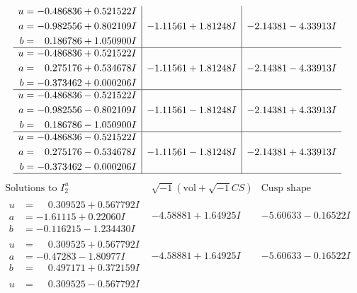\documentclass[1p]{elsarticle_modified}
\theoremstyle{definition}
\newcommand{\I}{\sqrt{-1}}
\begin{document}
$$\begin{array}{c|c|c}
\begin{aligned}
u &= -0.486836 + 0.521522 I \\
a &= -0.982556 + 0.802109 I \\
b &= \phantom{-}0.186786 + 1.050900 I\end{aligned}
 & -1.11561 + 1.81248 I & -2.14381 - 4.33913 I \\ \hline\begin{aligned}
u &= -0.486836 + 0.521522 I \\
a &= \phantom{-}0.275176 + 0.534678 I \\
b &= -0.373462 + 0.000206 I\end{aligned}
 & -1.11561 + 1.81248 I & -2.14381 - 4.33913 I \\ \hline\begin{aligned}
u &= -0.486836 - 0.521522 I \\
a &= -0.982556 - 0.802109 I \\
b &= \phantom{-}0.186786 - 1.050900 I\end{aligned}
 & -1.11561 - 1.81248 I & -2.14381 + 4.33913 I \\ \hline\begin{aligned}
u &= -0.486836 - 0.521522 I \\
a &= \phantom{-}0.275176 - 0.534678 I \\
b &= -0.373462 - 0.000206 I\end{aligned}
 & -1.11561 - 1.81248 I & -2.14381 + 4.33913 I\\
 \hline 
 \end{array}$$\newpage$$\begin{array}{c|c|c}  
\text{Solutions to }I^u_{2}& \I (\text{vol} + \sqrt{-1}CS) & \text{Cusp shape}\\
 \hline 
\begin{aligned}
u &= \phantom{-}0.309525 + 0.567792 I \\
a &= -1.61115 + 0.22060 I \\
b &= -0.116215 - 1.234430 I\end{aligned}
 & -4.58881 + 1.64925 I & -5.60633 - 0.16522 I \\ \hline\begin{aligned}
u &= \phantom{-}0.309525 + 0.567792 I \\
a &= -0.47283 - 1.80977 I \\
b &= \phantom{-}0.497171 + 0.372159 I\end{aligned}
 & -4.58881 + 1.64925 I & -5.60633 - 0.16522 I \\ \hline\begin{aligned}
u &= \phantom{-}0.309525 - 0.567792 I \\

\end{aligned}
\end{array}$$
\end{document}
